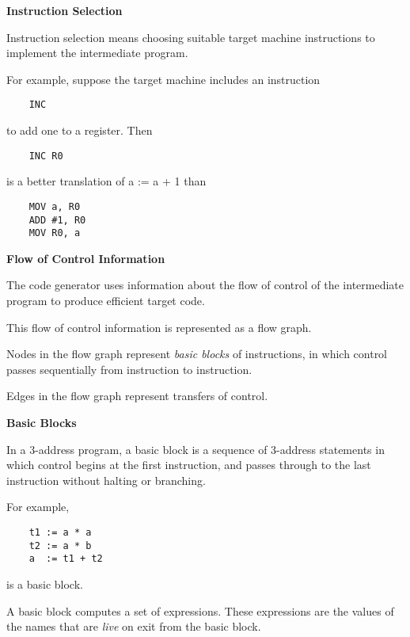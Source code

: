 %
%
\begin{slide}{}
{\bf Instruction Selection}

Instruction selection means choosing suitable target
machine instructions to implement the intermediate program.

For example, suppose the target machine includes an instruction\\                     
\begin{verbatim}
    INC
\end{verbatim}
to add one to a register.  Then\\                    
\begin{verbatim}
    INC R0
\end{verbatim}
is a better translation of a := a + 1 than\\
\begin{verbatim}
    MOV a, R0
    ADD #1, R0
    MOV R0, a
\end{verbatim}
\end{slide}
%
%
\begin{slide}{}
{\bf Flow of Control Information}                           

The code generator uses information about the
flow of control of the intermediate program to
produce efficient target code.

This flow of control information is represented
as a flow graph.

Nodes in the flow graph represent {\em basic blocks}
of instructions, in which control passes sequentially
from instruction to instruction.

Edges in the flow graph represent transfers of control.
\end{slide}
%
%
\begin{slide}{}
{\bf Basic Blocks}

In a 3-address program, a basic block is a sequence of
3-address statements in which control begins at the
first instruction, and passes through to the last instruction
without halting or branching.

For example,
\begin{verbatim}
    t1 := a * a
    t2 := a * b
    a  := t1 + t2
\end{verbatim}
is a basic block.

A basic block computes a set of expressions.  These expressions
are the values of the names that are {\em live} on exit from
the basic block.
\end{slide}
